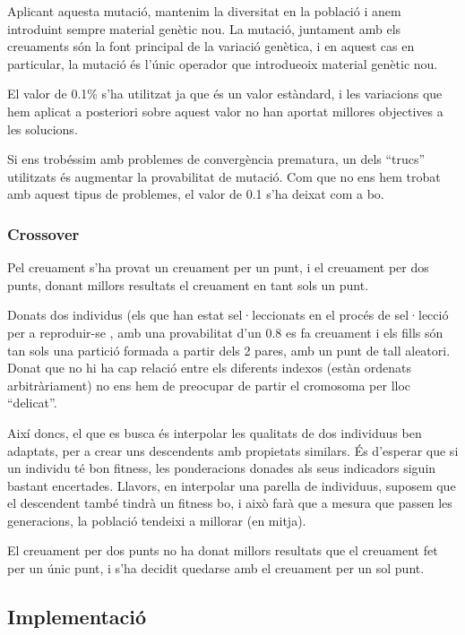 \documentclass[titlepage,a4paper,12pt]{book}
\begin{document}
Aplicant aquesta mutació, mantenim la diversitat en la població i anem
introduint sempre material genètic nou.  La mutació, juntament amb els
creuaments són la font principal de la variació genètica, i en aquest cas en
particular, la mutació és l'únic operador que introdueoix material genètic nou.

El valor de 0.1\% s'ha utilitzat ja que és un valor estàndard, i les variacions
que hem aplicat a posteriori sobre aquest valor no han aportat millores
objectives a les solucions.

Si ens trobéssim amb problemes de convergència prematura, un dels ``trucs''
utilitzats és augmentar la provabilitat de mutació.  Com que no ens hem trobat
amb aquest tipus de problemes, el valor de 0.1 s'ha deixat com a bo.

\subsubsection{Crossover} %
\label{ssub:Crossover}

Pel creuament s'ha provat un creuament per un punt, i el creuament per dos
punts, donant millors resultats el creuament en tant sols un punt.  

Donats dos individus (els que han estat sel·leccionats en el procés de
sel·lecció per a reproduir-se , amb una provabilitat d'un 0.8 es fa creuament i
els fills són tan sols una partició formada a partir dels 2 pares, amb un punt
de tall aleatori.  Donat que no hi ha cap relació entre els diferents indexos
(estàn ordenats arbitràriament) no ens hem de preocupar de partir el cromosoma
per lloc ``delicat''. 

Així doncs, el que es busca és interpolar les qualitats de dos individuus ben
adaptats, per a crear uns descendents amb propietats similars.  És d'esperar que
si un individu té bon fitness, les ponderacions donades als seus indicadors
siguin bastant encertades.  Llavors, en interpolar una parella de individuus,
suposem que el descendent també tindrà un fitness bo, i això farà que a mesura
que passen les generacions, la població tendeixi a millorar (en mitja).

El creuament per dos punts no ha donat millors resultats que el creuament fet
per un únic punt, i s'ha decidit quedarse amb el creuament per un sol punt.


\subsection{Implementació} %
	\label{sub:Implementacio}
\end{document}
